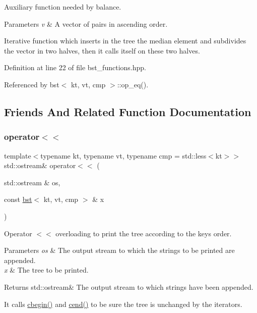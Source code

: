 Auxiliary function needed by balance. 


\begin{DoxyParams}{Parameters}
{\em v} & A vector of pairs in ascending order.\\
\hline
\end{DoxyParams}
Iterative function which inserts in the tree the median element and subdivides the vector in two halves, then it calls itself on these two halves. 

Definition at line 22 of file bst\+\_\+functions.\+hpp.



Referenced by bst$<$ kt, vt, cmp $>$\+::op\+\_\+eq().



\subsection{Friends And Related Function Documentation}
\mbox{\label{classbst_ae4b7d69364fca0855f74abdcad674ebf}} 
\subsubsection{\texorpdfstring{operator$<$$<$}{operator<<}}
{\footnotesize\ttfamily template$<$typename kt, typename vt, typename cmp = std\+::less$<$kt$>$$>$ \\
std\+::ostream\& operator$<$$<$ (\begin{DoxyParamCaption}\item[{std\+::ostream \&}]{os,  }\item[{const \hyperlink{classbst}{bst}$<$ kt, vt, cmp $>$ \&}]{x }\end{DoxyParamCaption})\hspace{0.3cm}{\ttfamily [friend]}}



Operator $<$$<$ overloading to print the tree according to the keys order. 


\begin{DoxyParams}{Parameters}
{\em os} & The output stream to which the strings to be printed are appended. \\
\hline
{\em x} & The tree to be printed. \\
\hline
\end{DoxyParams}
\begin{DoxyReturn}{Returns}
std\+::ostream\& The output stream to which strings have been appended.
\end{DoxyReturn}
It calls \hyperlink{classbst_a74e78aa7f879a5df0b933651174de42b}{cbegin()} and \hyperlink{classbst_a2f78931b69f0a121823b60393f1b9745}{cend()} to be sure the tree is unchanged by the iterators. 

